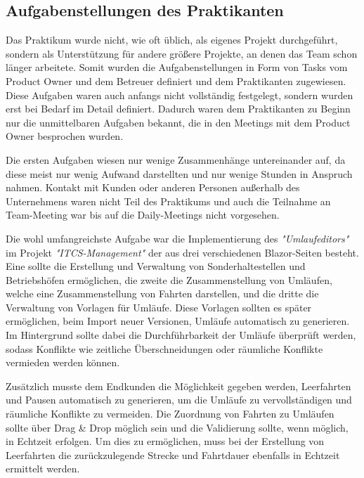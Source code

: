 \subsection{Aufgabenstellungen des Praktikanten}\label{sec:aufgabenstellung-praktikant}

    Das Praktikum wurde nicht, wie oft üblich, als eigenes Projekt durchgeführt, sondern als
    Unterstützung für andere größere Projekte, an denen das Team schon länger arbeitete. Somit wurden die Aufgabenstellungen in Form von Tasks vom Product Owner und dem Betreuer definiert 
    und dem Praktikanten zugewiesen. Diese Aufgaben waren auch anfangs nicht vollständig festgelegt, sondern wurden erst bei Bedarf im Detail definiert. Dadurch waren dem Praktikanten zu Beginn
    nur die unmittelbaren Aufgaben bekannt, die in den Meetings mit dem Product Owner besprochen wurden.
    
    Die ersten Aufgaben wiesen nur wenige Zusammenhänge untereinander auf, da diese meist nur wenig Aufwand darstellten und nur wenige Stunden in Anspruch nahmen. 
    Kontakt mit Kunden oder anderen Personen außerhalb des Unternehmens waren nicht Teil des Praktikums und auch die Teilnahme an Team-Meeting war bis auf die Daily-Meetings nicht vorgesehen.
    
    Die wohl umfangreichste Aufgabe war die Implementierung des  \emph{"Umlaufeditors"} im Projekt \emph{"ITCS-Management"} der aus drei verschiedenen Blazor-Seiten besteht. Eine sollte die Erstellung 
    und Verwaltung von Sonderhaltestellen und Betriebshöfen ermöglichen, die zweite die Zusammenstellung von Umläufen, welche eine Zusammenstellung von Fahrten darstellen, und 
    die dritte die Verwaltung von Vorlagen für Umläufe. Diese Vorlagen sollten es später ermöglichen, beim Import neuer Versionen, Umläufe automatisch zu generieren. Im Hintergrund sollte dabei
    die Durchführbarkeit der Umläufe überprüft werden, sodass Konflikte wie zeitliche Überschneidungen oder räumliche Konflikte vermieden werden können. 
    
    Zusätzlich musste dem 
    Endkunden die Möglichkeit gegeben werden, Leerfahrten und Pausen automatisch zu generieren, um die Umläufe zu vervollständigen und räumliche Konflikte zu vermeiden. Die Zuordnung 
    von Fahrten zu Umläufen sollte über Drag \& Drop möglich sein und die Validierung sollte, wenn möglich, in Echtzeit erfolgen. Um dies zu ermöglichen, muss bei der Erstellung von Leerfahrten die 
    zurückzulegende Strecke und Fahrtdauer ebenfalls in Echtzeit ermittelt werden.
    
